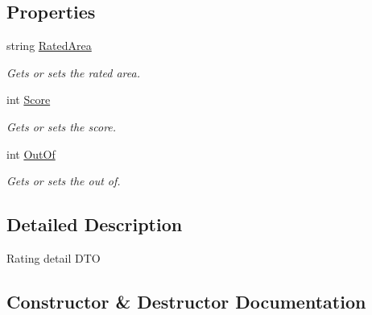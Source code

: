 \subsection*{Properties}
\begin{DoxyCompactItemize}
\item 
string \hyperlink{class_open_1_1_g_i_1_1hypermart_1_1_data_transformation_objects_1_1_rating_d_t_o_ad3282fe707334d675bc3c99694dff533}{Rated\+Area}
\begin{DoxyCompactList}\small\item\em Gets or sets the rated area. \end{DoxyCompactList}\item 
int \hyperlink{class_open_1_1_g_i_1_1hypermart_1_1_data_transformation_objects_1_1_rating_d_t_o_a8548920a2914900206fe636ca7aa7cbb}{Score}
\begin{DoxyCompactList}\small\item\em Gets or sets the score. \end{DoxyCompactList}\item 
int \hyperlink{class_open_1_1_g_i_1_1hypermart_1_1_data_transformation_objects_1_1_rating_d_t_o_a3a690d9692b556515be4aa8e2cc0af75}{Out\+Of}
\begin{DoxyCompactList}\small\item\em Gets or sets the out of. \end{DoxyCompactList}\end{DoxyCompactItemize}


\subsection{Detailed Description}
Rating detail D\+TO 



\subsection{Constructor \& Destructor Documentation}
\hypertarget{class_open_1_1_g_i_1_1hypermart_1_1_data_transformation_objects_1_1_rating_d_t_o_ab6f971e21c62e4004fdc0b20d1fea033}{}\label{class_open_1_1_g_i_1_1hypermart_1_1_data_transformation_objects_1_1_rating_d_t_o_ab6f971e21c62e4004fdc0b20d1fea033} 
